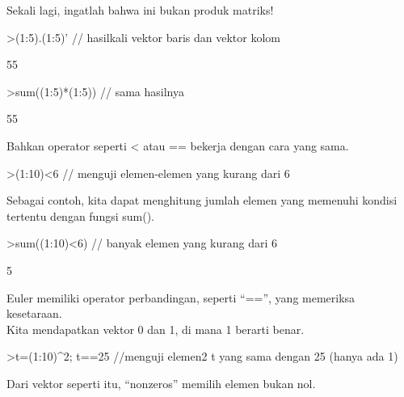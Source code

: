 \documentclass[a4paper,10pt]{article}
\begin{document}
\begin{eulernotebook}
\begin{eulercomment}
\begin{eulercomment}
\begin{eulercomment}
\begin{eulercomment}
\begin{eulercomment}
Sekali lagi, ingatlah bahwa ini bukan produk matriks!
\end{eulercomment}
\begin{eulerprompt}
>(1:5).(1:5)' // hasilkali vektor baris dan vektor kolom
\end{eulerprompt}
\begin{euleroutput}
  55
\end{euleroutput}
\begin{eulerprompt}
>sum((1:5)*(1:5)) // sama hasilnya
\end{eulerprompt}
\begin{euleroutput}
  55
\end{euleroutput}
\begin{eulercomment}
Bahkan operator seperti \textless{} atau == bekerja dengan cara yang sama.
\end{eulercomment}
\begin{eulerprompt}
>(1:10)<6 // menguji elemen-elemen yang kurang dari 6
\end{eulerprompt}
\begin{euleroutput}
  [1,  1,  1,  1,  1,  0,  0,  0,  0,  0]
\end{euleroutput}
\begin{eulercomment}
Sebagai contoh, kita dapat menghitung jumlah elemen yang memenuhi
kondisi tertentu dengan fungsi sum().
\end{eulercomment}
\begin{eulerprompt}
>sum((1:10)<6) // banyak elemen yang kurang dari 6
\end{eulerprompt}
\begin{euleroutput}
  5
\end{euleroutput}
\begin{eulercomment}
Euler memiliki operator perbandingan, seperti “==”, yang memeriksa
kesetaraan.\\
Kita mendapatkan vektor 0 dan 1, di mana 1 berarti benar.
\end{eulercomment}
\begin{eulerprompt}
>t=(1:10)^2; t==25 //menguji elemen2 t yang sama dengan 25 (hanya ada 1)
\end{eulerprompt}
\begin{euleroutput}
  [0,  0,  0,  0,  1,  0,  0,  0,  0,  0]
\end{euleroutput}
\begin{eulercomment}
Dari vektor seperti itu, “nonzeros” memilih elemen bukan nol.\\

\end{eulercomment}
\end{eulercomment}
\end{eulercomment}
\end{eulercomment}
\end{eulercomment}
\end{eulernotebook}
\end{document}
